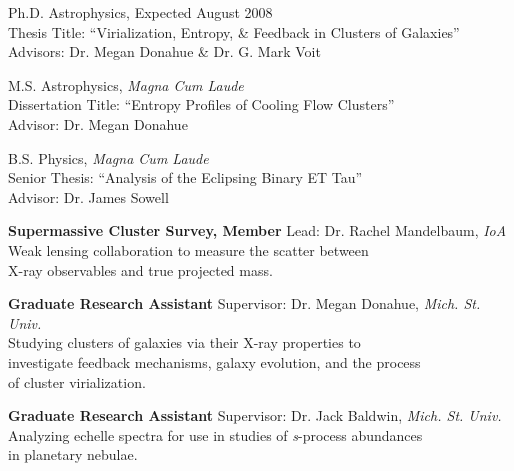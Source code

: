 \documentclass[12pt]{cv}
\begin{document}
\begin{llist}


Ph.D. Astrophysics, Expected August 2008\\
Thesis Title: ``Virialization, Entropy, \& Feedback in Clusters of Galaxies''\\
Advisors: Dr. Megan Donahue \& Dr. G. Mark Voit

M.S. Astrophysics, {\it Magna Cum Laude}\\
Dissertation Title: ``Entropy Profiles of Cooling Flow Clusters''\\
Advisor: Dr. Megan Donahue

B.S. Physics, {\it Magna Cum Laude}\\
Senior Thesis: ``Analysis of the Eclipsing Binary ET Tau''\\
Advisor: Dr. James Sowell


{\sc \bf{Supermassive Cluster Survey, Member}}
Lead: Dr. Rachel Mandelbaum, {\textit{IoA}}\\
Weak lensing collaboration to measure the scatter between\\
X-ray observables and true projected mass.

{\sc \bf{Graduate Research Assistant}}
Supervisor: Dr. Megan Donahue, {\textit{Mich. St. Univ.}}\\
Studying clusters of galaxies via their X-ray properties to\\
investigate feedback mechanisms, galaxy evolution, and the process\\
of cluster virialization.

{\sc \bf{Graduate Research Assistant}}
Supervisor: Dr. Jack Baldwin, {\textit{Mich. St. Univ.}}\\
Analyzing echelle spectra for use in studies of {\textit{s}}-process abundances\\
in planetary nebulae.


\end{llist}
\end{document}
